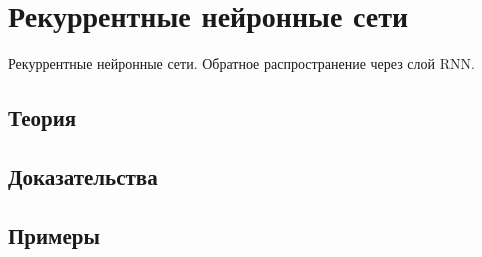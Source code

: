 
\section{Рекуррентные нейронные сети}
\label{sec:1.4.11-rnn}

\begin{ticket}
Рекуррентные нейронные сети. Обратное распространение через слой RNN.
\end{ticket}

\subsection*{Теория}

\subsection*{Доказательства}

\subsection*{Примеры}

